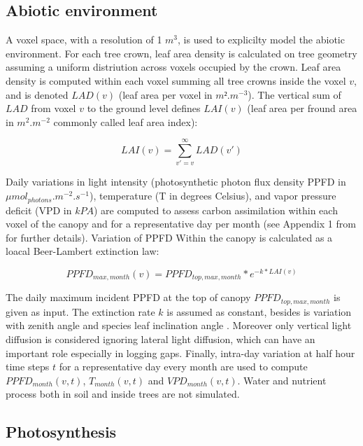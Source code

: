 \documentclass[]{article}
\theoremstyle{definition}
\theoremstyle{definition}
\theoremstyle{remark}
\begin{document}
\subsection{Abiotic environment}\label{abiotic-environment}

A voxel space, with a resolution of 1 \(m^3\), is used to explicilty
model the abiotic environment. For each tree crown, leaf area density is
calculated on tree geometry assuming a uniform distriution across voxels
occupied by the crown. Leaf area density is computed within each voxel
summing all tree crowns inside the voxel \(v\), and is denoted
\(LAD(v)\) (leaf area per voxel in \(m².m^{-3}\)). The vertical sum of
\(LAD\) from voxel \(v\) to the ground level defines \(LAI(v)\) (leaf
area per fround area in \(m^2.m^{-2}\) commonly called leaf area index):

\begin{equation}
  LAI(v) = \sum _{v'=v} ^\infty LAD(v') 
  \label{eq:LAI}
\end{equation}

Daily variations in light intensity (photosynthetic photon flux density
PPFD in \(\mu mol_{photons}.m^{-2}.s^{-1}\)), temperature (T in degrees
Celsius), and vapor pressure deficit (VPD in \(kPA\)) are computed to
assess carbon assimilation within each voxel of the canopy and for a
representative day per month (see Appendix 1 from \citet{Li} for further
details). Variation of PPFD Within the canopy is calculated as a loacal
Beer-Lambert extinction law:

\begin{equation}
  PPFD_{max,month}(v) = PPFD_{top,max,month}*e^{-k*LAI(v)}
  \label{eq:PPFD}
\end{equation}

The daily maximum incident PPFD at the top of canopy
\(PPFD_{top,max,month}\) is given as input. The extinction rate \(k\) is
assumed as constant, besides is variation with zenith angle and species
leaf inclination angle \citep{Meir2000}. Moreover only vertical light
diffusion is considered ignoring lateral light diffusion, which can have
an important role especially in logging gaps. Finally, intra-day
variation at half hour time steps \(t\) for a representative day every
month are used to compute \(PPFD_{month}(v,t)\), \(T_{month}(v,t)\) and
\(VPD_{month}(v,t)\). Water and nutrient process both in soil and inside
trees are not simulated.

\subsection{Photosynthesis}\label{photosynthesis}
\end{document}
